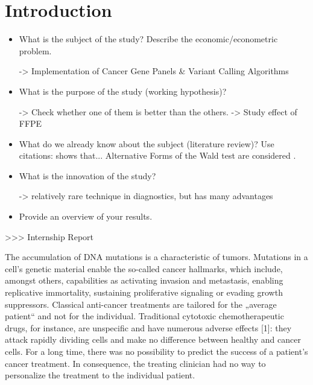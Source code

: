 \section{Introduction}

\begin{itemize}

\item What is the subject of the study? Describe the
economic/econometric problem.

-> Implementation of Cancer Gene Panels & Variant Calling Algorithms

\item What is the purpose of the study (working hypothesis)?

-> Check whether one of them is better than the others.
-> Study effect of FFPE

\item What do we already know about the subject (literature
review)? Use citations: { \cite{mutect:2013} shows that...
Alternative Forms of the Wald test are considered
\citep{Breusch&Schmidt:88}.}

\item What is the innovation of the study?

-> relatively rare technique in diagnostics, but has many advantages

\item Provide an overview of your results.


\end{itemize}

>>> Internship Report

The accumulation of DNA mutations is a characteristic of tumors. Mutations in a cell’s genetic material enable the so-called cancer hallmarks, which include, amongst others, capabilities as activating invasion and metastasis, enabling replicative immortality, sustaining proliferative signaling or evading growth suppressors. Classical anti-cancer treatments are tailored for the „average patient“ and not for the individual. Traditional cytotoxic chemotherapeutic drugs, for instance, are unspecific and have numerous adverse effects [1]: they attack rapidly dividing cells and make no difference between healthy and cancer cells. For a long time, there was no possibility to predict the success of a patient’s cancer treatment. In consequence, the treating clinician had no way to personalize the treatment to the individual patient.

